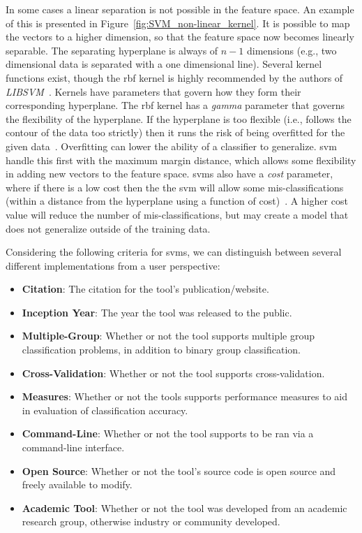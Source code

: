 In some cases a linear separation is not possible in the feature space. An example of this is presented in Figure~\ref{fig:SVM_non-linear_kernel}. It is possible to map the vectors to a higher dimension, so that the feature space now becomes linearly separable. The separating hyperplane is always of $n-1$ dimensions (e.g., two dimensional data is separated with a one dimensional line). Several kernel functions exist, though the \gls{rbf} kernel is highly recommended by the authors of \emph{LIBSVM}~\cite{HCL03}. Kernels have parameters that govern how they form their corresponding hyperplane. The \gls{rbf} kernel has a \emph{gamma} parameter that governs the flexibility of the hyperplane. If the hyperplane is too flexible (i.e., follows the contour of the data too strictly) then it runs the risk of being overfitted for the given data~\cite{BW10}. Overfitting can lower the ability of a classifier to generalize. \gls{svm} handle this first with the maximum margin distance, which allows some flexibility in adding new vectors to the feature space. \gls{svm}s also have a \emph{cost} parameter, where if there is a low cost then the the \gls{svm} will allow some mis-classifications (within a distance from the hyperplane using a function of cost)~\cite{BW10}. A higher cost value will reduce the number of mis-classifications, but may create a model that does not generalize outside of the training data.

Considering the following criteria for \gls{svm}s, we can distinguish between several different implementations from a user perspective:

\begin{itemize}
  \item \textbf{Citation}: The citation for the tool's publication/website.
  \item \textbf{Inception Year}: The year the tool was released to the public.
  \item \textbf{Multiple-Group}: Whether or not the tool supports multiple group classification problems, in addition to binary group classification.
  \item \textbf{Cross-Validation}: Whether or not the tool supports cross-validation.
  \item \textbf{Measures}: Whether or not the tools supports performance measures to aid in evaluation of classification accuracy.
  \item \textbf{Command-Line}: Whether or not the tool supports to be ran via a command-line interface.
  \item \textbf{Open Source}: Whether or not the tool's source code is open source and freely available to modify.
  \item \textbf{Academic Tool}: Whether or not the tool was developed from an academic research group, otherwise industry or community developed.
\end{itemize}

